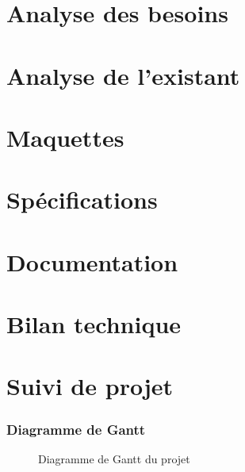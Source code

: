 \part{Analyse des besoins}
\setcounter{section}{0}


\part{Analyse de l'existant}
\setcounter{section}{0}


\part{Maquettes}
\setcounter{section}{0}


\part{Spécifications}
\setcounter{section}{0}



\part{Documentation}
\setcounter{section}{0}


\part{Bilan technique}
\setcounter{section}{0}

\part{Suivi de projet}
\setcounter{section}{0}
\section{Diagramme de Gantt}
\begin{figure}[H]
    \label{fig-gantt}
    \noindent{}
    \caption{Diagramme de Gantt du projet}
\end{figure}
